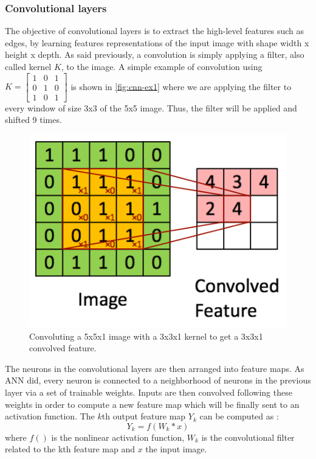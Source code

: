 \documentclass[11pt, openany]{report}
\theoremstyle{plain}
\theoremstyle{definition}
\theoremstyle{remark}
\begin{document}
\subsubsection{Convolutional layers} \label{sec:conv-layers}
The objective of convolutional layers is to extract the high-level features such as edges, by learning features representations of the input image with shape width x height x depth.  As said previously, a convolution is simply applying a filter, also called kernel $K$, to the image. A simple example of convolution using $K = \begin{bmatrix} 
1 & 0 & 1 \\
0 & 1 & 0 \\
1 & 0 & 1 
\end{bmatrix}$ 
is shown in \autoref{fig:cnn-ex1} where we are applying the filter to every window of size 3x3 of the 5x5 image. Thus, the filter will be applied and shifted 9 times. 

\begin{figure}[h]
  \centering
  \includegraphics[scale=0.55]{figures/cnn-ex1.png}
  \caption{Convoluting a 5x5x1 image with a 3x3x1 kernel to get a 3x3x1 convolved feature. }
  \label{fig:cnn-ex1}
\end{figure}

\newpage
The neurons in the convolutional layers are then arranged into feature maps. As ANN did, every neuron is connected to a neighborhood of neurons in the previous layer via a set of trainable weights. Inputs are then convolved following these weights in order to compute a new feature map which will be finally sent to an activation function.  
The $k$th output feature map $Y_{k}$ can be computed as \cite{CNN-1}: 
$$ Y_{k} = f(W_{k} * x) $$ 
where $f()$ is the nonlinear activation function, $W_{k}$ is the convolutional filter related to the kth feature map and $x$ the input image. 
\end{document}
